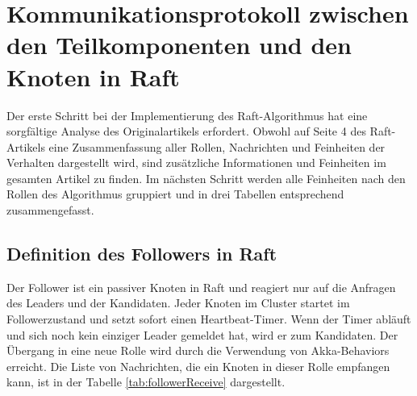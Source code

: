 \section{Kommunikationsprotokoll zwischen den Teilkomponenten und den Knoten in Raft}

Der erste Schritt bei der Implementierung des Raft-Algorithmus hat eine sorgfältige Analyse des Originalartikels erfordert. Obwohl auf Seite 4 des Raft-Artikels eine Zusammenfassung aller Rollen, Nachrichten und Feinheiten der Verhalten dargestellt wird, sind zusätzliche Informationen und Feinheiten im gesamten Artikel zu finden. Im nächsten Schritt werden alle Feinheiten nach den Rollen des Algorithmus gruppiert und in drei Tabellen entsprechend zusammengefasst.

\subsection{Definition des Followers in Raft}

Der Follower ist ein passiver Knoten in Raft und reagiert nur auf die Anfragen des Leaders und der Kandidaten. Jeder Knoten im Cluster startet im Followerzustand und setzt sofort einen Heartbeat-Timer. Wenn der Timer abläuft und sich noch kein einziger Leader gemeldet hat, wird er zum Kandidaten. Der Übergang in eine neue Rolle wird durch die Verwendung von Akka-Behaviors erreicht. Die Liste von Nachrichten, die ein Knoten in dieser Rolle empfangen kann, ist in der Tabelle \ref{tab:followerReceive} dargestellt.

